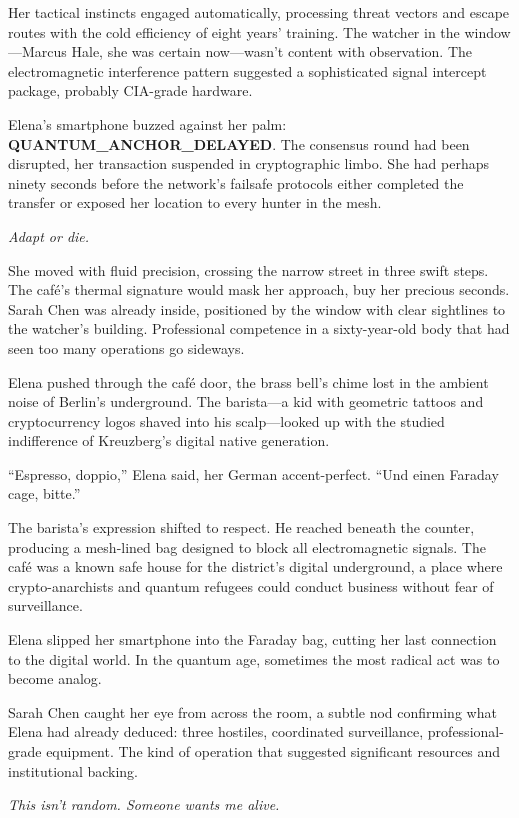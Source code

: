 Her tactical instincts engaged automatically, processing threat vectors and escape routes with the cold efficiency of eight years' training. The watcher in the window---Marcus Hale, she was certain now---wasn't content with observation. The electromagnetic interference pattern suggested a sophisticated signal intercept package, probably CIA-grade hardware.

Elena's smartphone buzzed against her palm: \textbf{QUANTUM\_ANCHOR\_DELAYED}. The consensus round had been disrupted, her transaction suspended in cryptographic limbo. She had perhaps ninety seconds before the network's failsafe protocols either completed the transfer or exposed her location to every hunter in the mesh.

\emph{Adapt or die.}

She moved with fluid precision, crossing the narrow street in three swift steps. The café's thermal signature would mask her approach, buy her precious seconds. Sarah Chen was already inside, positioned by the window with clear sightlines to the watcher's building. Professional competence in a sixty-year-old body that had seen too many operations go sideways.

Elena pushed through the café door, the brass bell's chime lost in the ambient noise of Berlin's underground. The barista---a kid with geometric tattoos and cryptocurrency logos shaved into his scalp---looked up with the studied indifference of Kreuzberg's digital native generation.

``Espresso, doppio,'' Elena said, her German accent-perfect. ``Und einen Faraday cage, bitte.''

The barista's expression shifted to respect. He reached beneath the counter, producing a mesh-lined bag designed to block all electromagnetic signals. The café was a known safe house for the district's digital underground, a place where crypto-anarchists and quantum refugees could conduct business without fear of surveillance.

Elena slipped her smartphone into the Faraday bag, cutting her last connection to the digital world. In the quantum age, sometimes the most radical act was to become analog.

Sarah Chen caught her eye from across the room, a subtle nod confirming what Elena had already deduced: three hostiles, coordinated surveillance, professional-grade equipment. The kind of operation that suggested significant resources and institutional backing.

\emph{This isn't random. Someone wants me alive.}

